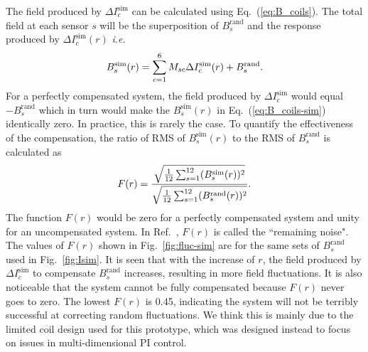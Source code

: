 
The field produced by $ \Delta I_c^{\text{sim}}$ can be calculated using Eq.~(\ref{eq:B_coils}). The total field at each sensor $s$ will be the superposition of $B_s^{\text{rand}}$ and the response produced by $ \Delta I_c^{\text{sim}}(r)$ {\it i.e.}
\begin{equation}\label{eq:B_coils-sim}
    B_s^{\text{sim}}(r) =\sum_{c=1}^6 M_{sc} \Delta I_c^{\text{sim}}(r) + B_s^{\text{rand}}{\rm .}
\end{equation}
For a perfectly compensated system, the field produced by $ \Delta I_c^{\text{sim}}$ would equal $- B_s^{\text{rand}}$ which in turn would make the $B_s^{\text{sim}}(r)$ in Eq.~(\ref{eq:B_coils-sim}) identically zero. In practice, this is rarely the case. To quantify the effectiveness of the compensation,  the ratio of RMS of $B_s^{\text{sim}}(r)$ to the RMS of $B_s^{\text{rand}}$ is calculated as
\begin{equation}\label{eq:fluc}
    F(r)=\frac{\sqrt{\frac{1}{12} \sum_{s=1}^{12} (B_s^{\text{sim}}(r))^2}}{\sqrt{\frac{1}{12} \sum_{s=1}^{12} (B_s^{\text{rand}}(r))^2}}{\rm .}
\end{equation}
The function $F(r)$ would be zero for a perfectly compensated system and unity for an uncompensated system. In Ref.~\cite{bea}, $F(r)$ is called the ``remaining noise". The values of $F(r)$ shown in Fig.~\ref{fig:fluc-sim} are for the same sets of $B_s^{\text{rand}}$ used in Fig.~\ref{fig:Isim}. It is seen that with the increase of $r$, the field produced by $\Delta I_c^{\text{sim}}$ to compensate $B_s^{\text{rand}}$ increases, resulting in more field fluctuations. It is also noticeable that the system cannot be fully compensated because $F(r)$ never goes to zero. The lowest $F(r)$ is 0.45, indicating the system will not be terribly successful at correcting random fluctuations. We think this is mainly due to the limited coil design used for this prototype, which was designed instead to focus on issues in multi-dimensional PI control.


